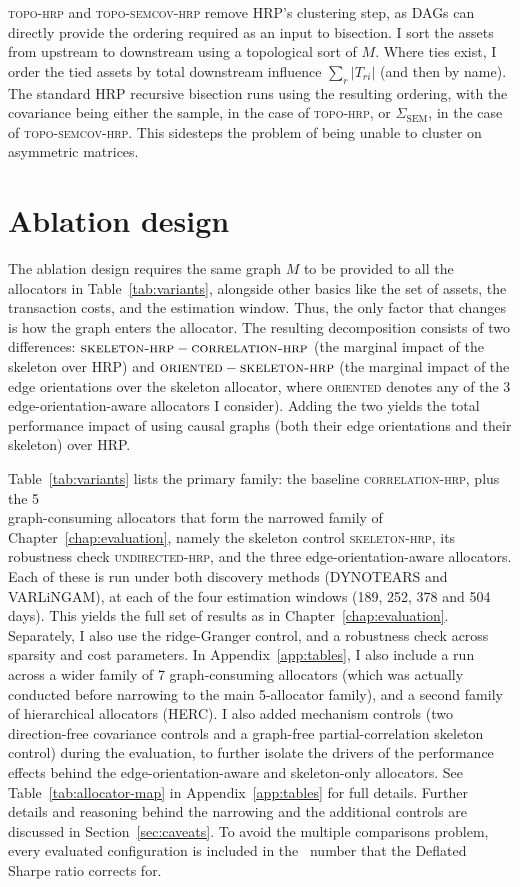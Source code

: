 \documentclass[11pt, a4paper]{report}
\newcommand{\corrhrp}{\textsc{correlation-hrp}}
\newcommand{\skelhrp}{\textsc{skeleton-hrp}}
\newcommand{\undirhrp}{\textsc{undirected-hrp}}
\newcommand{\topohrp}{\textsc{topo-hrp}}
\newcommand{\toposemcovhrp}{\textsc{topo-semcov-hrp}}
\newcommand{\oriented}{\textsc{oriented}}
\begin{document}
\topohrp{} and \toposemcovhrp{} remove HRP's clustering step, as DAGs can directly provide the ordering required as an input to bisection.
I sort the assets from upstream to downstream using a topological sort of $M$. 
Where ties exist, I order the tied assets by total downstream influence
$\sum_r |T_{ri}|$ (and then by name). 
The standard HRP recursive bisection runs using the resulting ordering, with the covariance being either the sample, in the case of \topohrp{}, or $\Sigma_{\mathrm{SEM}}$, in the case of \toposemcovhrp{}.
This sidesteps the problem of being unable to cluster on asymmetric matrices.

\section{Ablation design}
\label{sec:ablation-design}

The ablation design requires the same graph $M$ to be provided to all the allocators in Table~\ref{tab:variants}, alongside other basics like the set of assets, the transaction costs, and the estimation window.
Thus, the only factor that changes is
how the graph enters the allocator.
The resulting decomposition consists of two differences: $\skelhrp{}-\corrhrp{}$ (the marginal impact of the skeleton over HRP) and $\oriented{}-\skelhrp{}$ (the marginal impact of the edge orientations over the skeleton allocator, where \oriented{} denotes any of the 3 edge-orientation-aware allocators I consider). Adding the two yields the total performance impact of using causal graphs (both their edge orientations and their skeleton) over HRP.

Table~\ref{tab:variants} lists the primary family: the baseline \corrhrp{}, plus the 5 \\
graph-consuming allocators that form the narrowed family of Chapter~\ref{chap:evaluation}, namely the skeleton control \skelhrp{}, its robustness check \undirhrp{}, and the three edge-orientation-aware allocators. 
Each of these is run under both discovery methods (DYNOTEARS and VARLiNGAM), at each of
the four estimation windows (189, 252, 378 and 504 days). This yields the full set of results as in Chapter~\ref{chap:evaluation}.
Separately, I also use the ridge-Granger control, and a robustness check across sparsity and cost parameters.
In Appendix~\ref{app:tables}, I also include a run across a wider family of 7 graph-consuming allocators (which was actually conducted before narrowing to the main 5-allocator family), and a second family of hierarchical allocators (HERC). I also added mechanism controls (two direction-free covariance controls and a graph-free partial-correlation skeleton control) during the evaluation, to further isolate the drivers of the performance effects behind the edge-orientation-aware and skeleton-only allocators. See Table~\ref{tab:allocator-map} in Appendix~\ref{app:tables} for full details. 
Further details and reasoning behind the narrowing and the additional controls
are discussed in Section~\ref{sec:caveats}. To avoid the multiple comparisons problem, every evaluated configuration is included in the \rsNtrials\ number that the Deflated Sharpe
ratio corrects for. 
\end{document}
